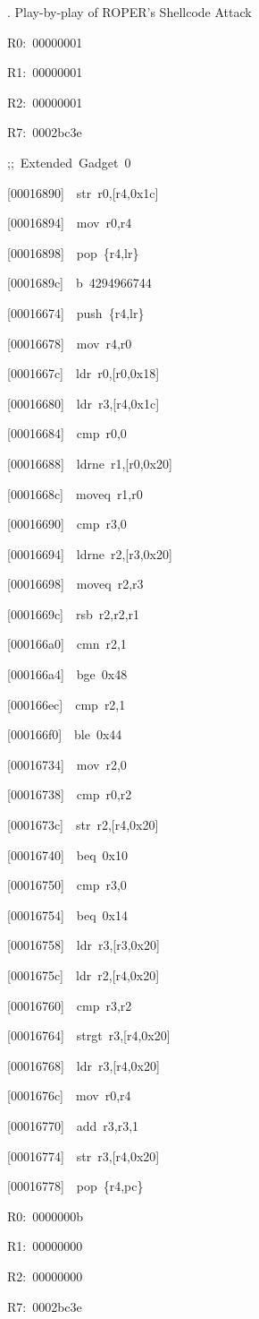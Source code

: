 \documentclass[9pt]{beamer}
\newcommand{\Gap} { \\ \pause \vspace{8pt} }
\begin{document}
\begin{frame}{\theframenumber. Play-by-play of ROPER's Shellcode Attack}
\begin{multicols}{3}
R0:~00000001

R1:~00000001

R2:~00000001

R7:~0002bc3e
\Gap


{\color{title};;~Extended~Gadget~0}

[\alert<@+|+->{00016890}]~~str~r0,[r4,0x1c]

[00016894]~~mov~r0,r4

[00016898]~~pop~\{r4,lr\}

[0001689c]~~b~4294966744

\alert<@+|+->{[00016674]~~push~\{r4,lr\}}

[00016678]~~mov~r4,r0

[0001667c]~~ldr~r0,[r0,0x18]

[00016680]~~ldr~r3,[r4,0x1c]

[00016684]~~cmp~r0,0

[00016688]~~ldrne~r1,[r0,0x20]

[0001668c]~~moveq~r1,r0

[00016690]~~cmp~r3,0

[00016694]~~ldrne~r2,[r3,0x20]

[00016698]~~moveq~r2,r3

[0001669c]~~rsb~r2,r2,r1

[000166a0]~~cmn~r2,1

[000166a4]~~bge~0x48

[000166ec]~~cmp~r2,1

\alert<@+|+->{[000166f0]~~ble~0x44}

[00016734]~~mov~r2,0

[00016738]~~cmp~r0,r2

[0001673c]~~str~r2,[r4,0x20]

\alert<@+|+->{[00016740]~~beq~0x10}

[00016750]~~cmp~r3,0

[00016754]~~beq~0x14

[00016758]~~ldr~r3,[r3,0x20]

[0001675c]~~ldr~r2,[r4,0x20]

[00016760]~~cmp~r3,r2

[00016764]~~strgt~r3,[r4,0x20]

[00016768]~~ldr~r3,[r4,0x20]

[0001676c]~~mov~r0,r4

[00016770]~~add~r3,r3,1

[00016774]~~str~r3,[r4,0x20]

[00016778]~~pop~\{r4,pc\}
\vspace{4pt}


R0:~0000000b

R1:~00000000

R2:~00000000

R7:~0002bc3e



\end{multicols}

\end{frame}
\end{document}

